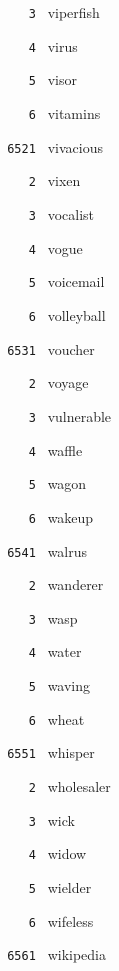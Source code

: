 \documentclass[11pt]{article}
\begin{document}
\begin{multicols}{6}
\noindent \texttt{ \ \ \ 3 } viperfish  \par
\noindent \texttt{ \ \ \ 4 } virus  \par
\noindent \texttt{ \ \ \ 5 } visor  \par
\noindent \texttt{ \ \ \ 6 } vitamins  \par
\vspace{3mm}
\noindent \texttt{ 6521 } vivacious  \par
\noindent \texttt{ \ \ \ 2 } vixen  \par
\noindent \texttt{ \ \ \ 3 } vocalist  \par
\noindent \texttt{ \ \ \ 4 } vogue  \par
\noindent \texttt{ \ \ \ 5 } voicemail  \par
\noindent \texttt{ \ \ \ 6 } volleyball  \par
\vspace{3mm}
\noindent \texttt{ 6531 } voucher  \par
\noindent \texttt{ \ \ \ 2 } voyage  \par
\noindent \texttt{ \ \ \ 3 } vulnerable  \par
\noindent \texttt{ \ \ \ 4 } waffle  \par
\noindent \texttt{ \ \ \ 5 } wagon  \par
\noindent \texttt{ \ \ \ 6 } wakeup  \par
\vspace{3mm}
\noindent \texttt{ 6541 } walrus  \par
\noindent \texttt{ \ \ \ 2 } wanderer  \par
\noindent \texttt{ \ \ \ 3 } wasp  \par
\noindent \texttt{ \ \ \ 4 } water  \par
\noindent \texttt{ \ \ \ 5 } waving  \par
\noindent \texttt{ \ \ \ 6 } wheat  \par
\vspace{3mm}
\noindent \texttt{ 6551 } whisper  \par
\noindent \texttt{ \ \ \ 2 } wholesaler  \par
\noindent \texttt{ \ \ \ 3 } wick  \par
\noindent \texttt{ \ \ \ 4 } widow  \par
\noindent \texttt{ \ \ \ 5 } wielder  \par
\noindent \texttt{ \ \ \ 6 } wifeless  \par
\vspace{3mm}
\noindent \texttt{ 6561 } wikipedia  \par

\end{multicols}
\end{document}
